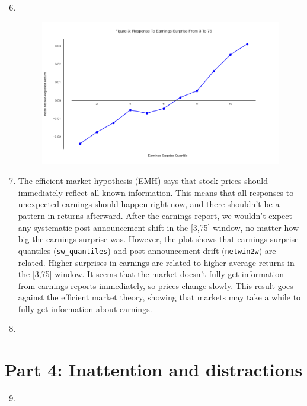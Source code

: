 \documentclass[11pt]{article}
\begin{document}
\begin{enumerate}
\setcounter{enumi}{5}
\renewcommand{\labelenumi}{(\theenumi)}
    \item \, \\
    \begin{figure}[H] 
        \centering
        \includegraphics[width=.8\textwidth]{fig3.png}
    \end{figure}
    
    \item The efficient market hypothesis (EMH) says that stock prices should immediately reflect all known information. 
    This means that all responses to unexpected earnings should happen right now, and there shouldn't be a pattern in 
    returns afterward. After the earnings report, we wouldn't expect any systematic post-announcement shift in 
    the [3,75] window, no matter how big the earnings surprise was. However, the plot shows that earnings surprise 
    quantiles (\texttt{sw\_quantiles}) and post-announcement drift (\texttt{netwin2w}) are related. Higher surprises 
    in earnings are related to higher average returns in the [3,75] window. It seems that the market doesn’t fully get 
    information from earnings reports immediately, so prices change slowly. This result goes against the efficient 
    market theory, showing that markets may take a while to fully get information about earnings.
    
    \item 


\end{enumerate}

\section{Part 4: Inattention and distractions}

\begin{enumerate}
\setcounter{enumi}{8}
\renewcommand{\labelenumi}{(\theenumi)}
    \item 

\end{enumerate}
\end{document}
